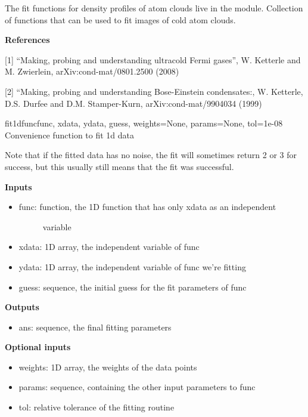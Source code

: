 \documentclass[letterpaper,10pt,english]{manual}
\begin{document}
The fit functions for density profiles of atom clouds live in the  module.
\hypertarget{module-odysseus.fitfuncs}{}
\modulesynopsis{}
Collection of functions that can be used to fit images of cold atom clouds.

\textbf{References}

{[}1{]} ``Making, probing and understanding ultracold Fermi gases'', W. Ketterle and
M. Zwierlein, arXiv:cond-mat/0801.2500 (2008)

{[}2{]} ``Making, probing and understanding Bose-Einstein condensates:, W. Ketterle,
D.S. Durfee and D.M. Stamper-Kurn, arXiv:cond-mat/9904034 (1999)

\hypertarget{odysseus.fitfuncs.fit1dfunc}{}\begin{funcdesc}{fit1dfunc}{func, xdata, ydata, guess, weights=None, params=None, tol=1e-08}
Convenience function to fit 1d data

Note that if the fitted data has no noise, the fit will sometimes return
2 or 3 for success, but this usually still means that the fit was successful.

\textbf{Inputs}
\begin{itemize}
\item {} \begin{description}
\item[func: function, the 1D function that has only xdata as an independent] \leavevmode
variable

\end{description}

\item {} 
xdata: 1D array, the independent variable of func

\item {} 
ydata: 1D array, the independent variable of func we're fitting

\item {} 
guess: sequence, the initial guess for the fit parameters of func

\end{itemize}

\textbf{Outputs}
\begin{itemize}
\item {} 
ans: sequence, the final fitting parameters

\end{itemize}

\textbf{Optional inputs}
\begin{itemize}
\item {} 
weights: 1D array, the weights of the data points

\item {} 
params: sequence, containing the other input parameters to func

\item {} 
tol: relative tolerance of the fitting routine

\end{itemize}
\end{funcdesc}
\end{document}
